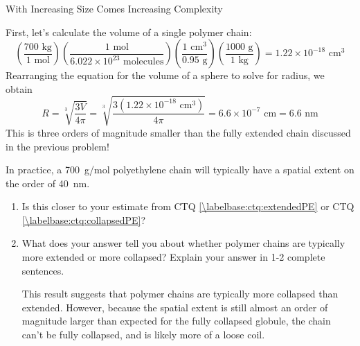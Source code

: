\begin{activity}{With Increasing Size Comes Increasing Complexity}
\begin{ctqs}
		\begin{solution}[3.85in]
			First, let's calculate the volume of a single polymer chain:
			\begin{equation*}
				\left(\frac{700\text{ kg}}{1\text{ mol}}\right)
				\left(\frac{1\text{ mol}}{6.022\times10^{23}\text{ molecules}}\right)
				\left(\frac{1\text{ cm}^3}{0.95\text{ g}}\right)
				\left(\frac{1000\text{ g}}{1\text{ kg}}\right)
				= 1.22 \times 10^{-18}\text{ cm}^3
			\end{equation*}
			Rearranging the equation for the volume of a sphere to solve for radius, we obtain
			\begin{equation*}
				R=\sqrt[3]{\frac{3 V}{4\pi}} = \sqrt[3]{\frac{3 \left(1.22 \times 10^{-18}\text{ cm}^3\right)}{4\pi}} = 6.6 \times 10^{-7}\text{ cm} = 6.6\text{ nm}
			\end{equation*}
			This is three orders of magnitude smaller than the fully extended chain discussed in the previous problem!
		\end{solution}
		
	\question In practice, a 700~g/mol polyethylene chain will typically have a spatial extent on the order of 40~nm.  
	
		\begin{enumerate}
			\item Is this closer to your estimate from CTQ \ref{\labelbase:ctq:extendedPE} or CTQ \ref{\labelbase:ctq:collapsedPE}?
			
				\begin{solution}[0.5in]\end{solution}
			
			\item What does your answer tell you about whether polymer chains are typically more extended or more collapsed?  Explain your answer in 1-2 complete sentences.
			
				\begin{solution}[1.75in]
					This result suggests that polymer chains are typically more collapsed than extended.  However, because the spatial extent is still almost an order of magnitude larger than expected for the fully collapsed globule, the chain can't be fully collapsed, and is likely more of a loose coil.
				\end{solution}
			
		\end{enumerate}
		

\end{ctqs}
\end{activity}
